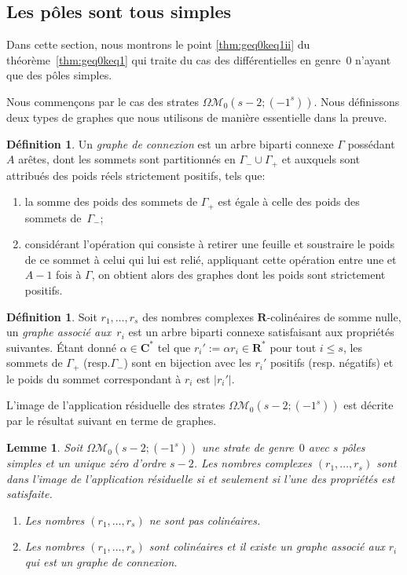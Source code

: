\documentclass[11pt]{article}
\newcommand{\resp}{resp.\xspace}
\numberwithin{equation}{section}\renewcommand{\proofname}{Démonstration}
\let\mathcal\mathscr
\newenvironment{enumeratei}
{\bgroup\def\theenumi{\roman{enumi}}\def\theenumii{\arabic{enumii}}\begin{enumerate}}
{\end{enumerate}\egroup}
\newcommand{\RR}{\mathbf{R}}
\newcommand{\CC}{\mathbf{C}}
\newcommand{\omoduli}[1][g]{{\Omega\mathcal M}_{\!#1}}
\newtheorem{lem}[thm]{Lemme}
\theoremstyle{definition}
\newtheorem{defn}[thm]{Définition}
\begin{document}
\subsection{Les pôles sont tous simples}
\label{sec:caslier}
Dans cette section, nous montrons le point \eqref{thm:geq0keq1ii} du théorème~\ref{thm:geq0keq1} qui traite du cas des différentielles en genre~$0$ n'ayant que des pôles simples.

Nous commençons par le cas des strates $\omoduli[0](s-2;(-1^{s}))$. Nous définissons deux types de graphes que nous utilisons de manière essentielle dans la preuve.

\begin{defn}\label{def:grapheconnexion}
Un \emph{graphe de connexion} est un arbre biparti connexe $\Gamma$ possédant~$A$ arêtes, dont les sommets sont partitionnés en $\Gamma_{-}\cup\Gamma_{+}$ et auxquels sont attribués des poids réels strictement positifs, tels que:
\begin{enumeratei}
\item\label{def:grapheconnexioni} la somme des poids des sommets de $\Gamma_{+}$ est égale à celle des poids des sommets de~$\Gamma_{-}$;
\item\label{def:grapheconnexionii} considérant l'opération qui consiste à retirer une feuille et soustraire le poids de ce sommet à celui qui lui est relié, appliquant cette opération entre une et $A-1$ fois à $\Gamma$, on obtient alors des graphes dont les poids sont strictement positifs.
\end{enumeratei}
\end{defn}

\begin{defn}
Soit $r_{1},\dots,r_{s}$ des nombres complexes $\RR$-colinéaires de somme nulle, un \emph{graphe associé aux~$r_{i}$} est un arbre biparti connexe satisfaisant aux propriétés suivantes. Étant donné $\alpha\in\CC^{\ast}$ tel que $r_{i}':=\alpha r_{i}\in\RR^{\ast}$ pour tout $i\leq s$, les sommets de $\Gamma_{+}$ (\resp $\Gamma_{-}$) sont en bijection avec les $r_{i}'$ positifs (\resp négatifs) et le poids du sommet correspondant à $r_{i}$ est $|r_{i}'|$.
\end{defn}

L'image de l'application résiduelle des strates $\omoduli[0](s-2;(-1^{s}))$ est décrite par le résultat suivant en terme de graphes.
\begin{lem}\label{lem:gzeropolesimples}
Soit $\omoduli[0](s-2;(-1^{s}))$ une strate de genre~$0$ avec $s$ pôles simples et un unique zéro d'ordre $s-2$. Les nombres complexes $(r_{1},\ldots,r_{s})$ sont dans l'image de l'application résiduelle si et seulement si
l'une des propriétés est satisfaite.
\begin{enumerate}
\item\label{lem:gzeropolesimples1} Les nombres $(r_{1},\ldots,r_{s})$ ne sont pas colinéaires.
\item\label{lem:gzeropolesimples2} Les nombres $(r_{1},\ldots,r_{s})$ sont colinéaires et il existe un graphe associé aux $r_{i}$ qui est un graphe de connexion.
\end{enumerate}
\end{lem}
\end{document}
